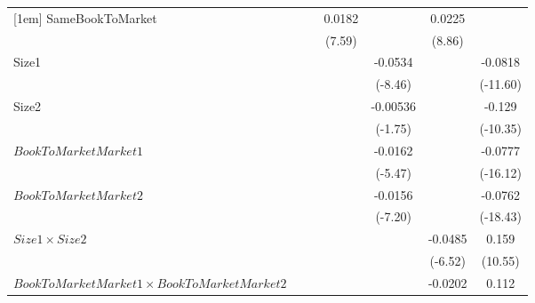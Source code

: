 {\begin{tabular}{l*{6}{c}}
[1em]
SameBookToMarket    &                     &                     &      0.0182\sym{***}&                     &      0.0225\sym{***}&                     \\
                    &                     &                     &      (7.59)         &                     &      (8.86)         &                     \\
[1em]
Size1               &                     &                     &                     &     -0.0534\sym{***}&                     &     -0.0818\sym{***}\\
                    &                     &                     &                     &     (-8.46)         &                     &    (-11.60)         \\
[1em]
Size2               &                     &                     &                     &    -0.00536         &                     &      -0.129\sym{***}\\
                    &                     &                     &                     &     (-1.75)         &                     &    (-10.35)         \\
[1em]
$ BookToMarketMarket1 $&                     &                     &                     &     -0.0162\sym{***}&                     &     -0.0777\sym{***}\\
                    &                     &                     &                     &     (-5.47)         &                     &    (-16.12)         \\
[1em]
$ BookToMarketMarket2 $&                     &                     &                     &     -0.0156\sym{***}&                     &     -0.0762\sym{***}\\
                    &                     &                     &                     &     (-7.20)         &                     &    (-18.43)         \\
[1em]
$ Size1 \times Size2 $&                     &                     &                     &                     &     -0.0485\sym{***}&       0.159\sym{***}\\
                    &                     &                     &                     &                     &     (-6.52)         &     (10.55)         \\
[1em]
$ BookToMarketMarket1 \times BookToMarketMarket2 $&                     &                     &                     &                     &     -0.0202\sym{***}&       0.112\sym{***}\\

\end{tabular}}
